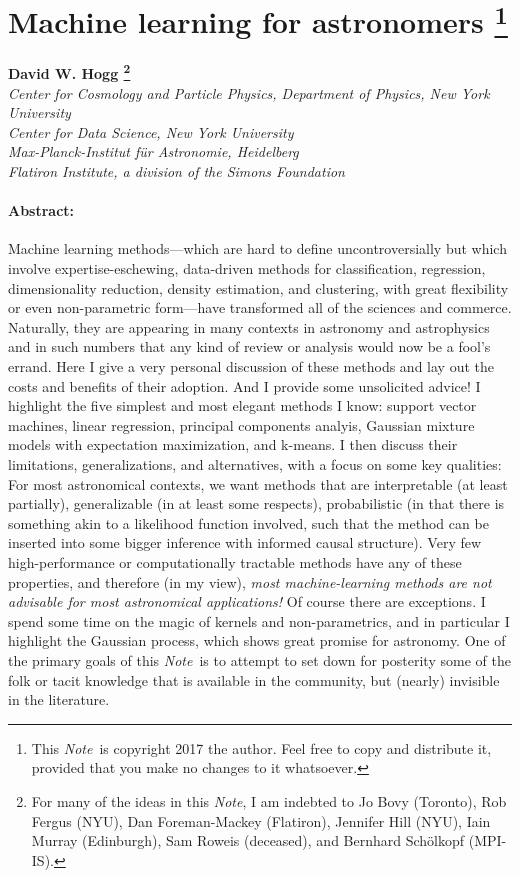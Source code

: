 \documentclass[12pt, letterpaper]{article}
\newcommand{\documentname}{\textsl{Note}}
\begin{document}
\sloppy\sloppypar\raggedbottom\frenchspacing

\section*{Machine learning for astronomers%
\footnote{This \documentname\ is copyright 2017 the author. Feel free to copy and
distribute it, provided that you make no changes to it whatsoever.}}

\noindent
\textbf{David W. Hogg%
\footnote{For many of the ideas in this \documentname, I am indebted to
  Jo Bovy (Toronto),
  Rob Fergus (NYU),
  Dan Foreman-Mackey (Flatiron),
  Jennifer Hill (NYU),
  Iain Murray (Edinburgh),
  Sam Roweis (deceased),
  and
  Bernhard Sch\"olkopf (MPI-IS).}}\\
\textsl{\footnotesize
  Center for Cosmology and Particle Physics, Department of Physics, New York University \\
  Center for Data Science, New York University \\
  Max-Planck-Institut f\"ur Astronomie, Heidelberg \\
  Flatiron Institute, a division of the Simons Foundation}

\paragraph{Abstract:}
Machine learning methods---which are hard to define uncontroversially
but which involve expertise-eschewing, data-driven methods for classification,
regression, dimensionality reduction, density estimation, and clustering,
with great flexibility or even non-parametric form---have transformed all
of the sciences and commerce.
Naturally, they are appearing in many contexts in astronomy and astrophysics and
in such numbers that any kind of review or analysis would now be a fool's errand.
Here I give a very personal discussion of these methods and lay out the costs and
benefits of their adoption.
And I provide some unsolicited advice!
I highlight the five simplest and most elegant methods I know: support vector
machines, linear regression, principal components analyis, Gaussian mixture models
with expectation maximization, and k-means.
I then discuss their limitations, generalizations, and alternatives, with a focus
on some key qualities:
For most astronomical contexts, we want methods that are interpretable (at least
partially), generalizable (in at least some respects), probabilistic (in that
there is something akin to a likelihood function involved, such that the method can
be inserted into some bigger inference with informed causal structure).
Very few high-performance or computationally tractable methods have any of these
properties, and therefore (in my view),
\emph{most machine-learning methods are not advisable for most astronomical
applications!}
Of course there are exceptions.
I spend some time on the magic of kernels and non-parametrics, and in particular
I highlight the Gaussian process, which shows great promise for astronomy.
One of the primary goals of this \documentname\ is to attempt to set down for posterity
some of the folk or tacit knowledge that is available in the community, but
(nearly) invisible in the literature.
\end{document}
